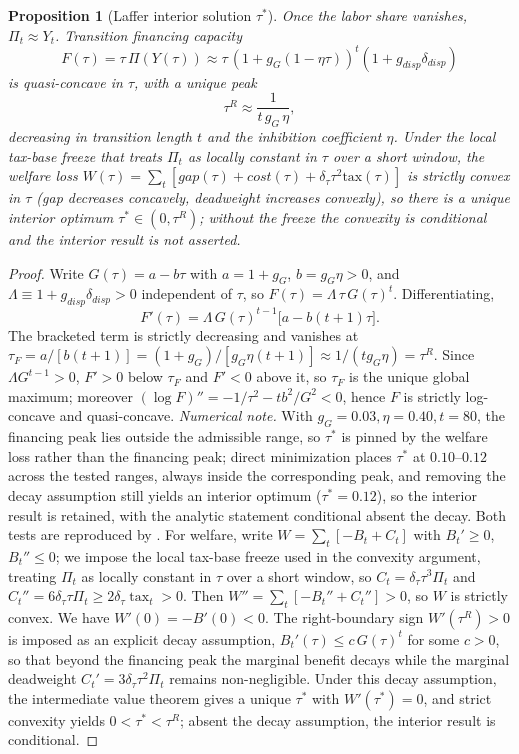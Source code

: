 \documentclass[review,12pt]{elsarticle}
\theoremstyle{plain}
\newtheorem{proposition}[theorem]{Proposition}
\theoremstyle{definition}
\theoremstyle{remark}
\begin{document}
\begin{proposition}[Laffer interior solution $\tau^*$]
\label{prop3b}
Once the labor share vanishes, $\Pi_t\approx Y_t$. Transition financing capacity
\[
F(\tau)=\tau\,\Pi(Y(\tau))\approx\tau\,(1+g_G(1-\eta\tau))^{t}(1+g_{disp}\delta_{disp})
\]
is \emph{quasi-concave} in $\tau$, with a unique peak
\[
\tau^{R}\approx\frac{1}{t\,g_G\,\eta},
\]
decreasing in transition length $t$ and the inhibition coefficient $\eta$. Under the local tax-base freeze that treats $\Pi_t$ as locally constant in $\tau$ over a short window, the welfare loss $W(\tau)=\sum_t[gap(\tau)+cost(\tau)+\delta_\tau\tau^2\text{tax}(\tau)]$ is strictly convex in $\tau$ (gap decreases concavely, deadweight increases convexly), so there is a unique interior optimum $\tau^*\in(0,\tau^{R})$; without the freeze the convexity is conditional and the interior result is not asserted.
\end{proposition}
\begin{proof}
Write $G(\tau)=a-b\tau$ with $a=1+g_G$, $b=g_G\eta>0$, and $\Lambda\equiv1+g_{disp}\delta_{disp}>0$ independent of $\tau$, so $F(\tau)=\Lambda\,\tau\,G(\tau)^t$. Differentiating,
\[
F'(\tau)=\Lambda\,G(\tau)^{t-1}\big[a-b(t+1)\tau\big].
\]
The bracketed term is strictly decreasing and vanishes at $\tau_F=a/[b(t+1)]=(1+g_G)/[g_G\eta(t+1)]\approx1/(t g_G\eta)=\tau^R$. Since $\Lambda G^{t-1}>0$, $F'>0$ below $\tau_F$ and $F'<0$ above it, so $\tau_F$ is the unique global maximum; moreover $(\log F)''=-1/\tau^2-tb^2/G^2<0$, hence $F$ is strictly log-concave and quasi-concave.
\smallskip\noindent\emph{Numerical note.} With $g_G=0.03,\eta=0.40,t=80$, the financing peak lies outside the admissible range, so $\tau^*$ is pinned by the welfare loss rather than the financing peak; direct minimization places $\tau^*$ at $0.10$--$0.12$ across the tested ranges, always inside the corresponding peak, and removing the decay assumption still yields an interior optimum ($\tau^*=0.12$), so the interior result is retained, with the analytic statement conditional absent the decay. Both tests are reproduced by .
\smallskip\noindent For welfare, write $W=\sum_t[-B_t+C_t]$ with $B_t'\ge0$, $B_t''\le0$; we impose the local tax-base freeze used in the convexity argument, treating $\Pi_t$ as locally constant in $\tau$ over a short window, so $C_t=\delta_\tau\tau^3\Pi_t$ and $C_t''=6\delta_\tau\tau\Pi_t\ge2\delta_\tau\operatorname{tax}_t>0$. Then $W''=\sum_t[-B_t''+C_t'']>0$, so $W$ is strictly convex. We have $W'(0)=-B'(0)<0$. The right-boundary sign $W'(\tau^R)>0$ is imposed as an explicit decay assumption, $B_t'(\tau)\le c\,G(\tau)^t$ for some $c>0$, so that beyond the financing peak the marginal benefit decays while the marginal deadweight $C_t'=3\delta_\tau\tau^2\Pi_t$ remains non-negligible. Under this decay assumption, the intermediate value theorem gives a unique $\tau^*$ with $W'(\tau^*)=0$, and strict convexity yields $0<\tau^*<\tau^R$; absent the decay assumption, the interior result is conditional.
\end{proof}
\end{document}
